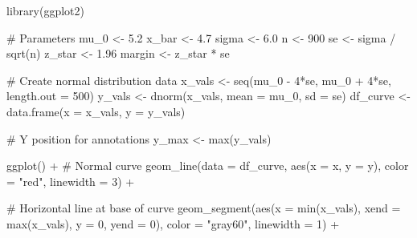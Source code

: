 \documentclass[
  letterpaper,
  DIV=11,
  numbers=noendperiod]{scrreprt}
\newenvironment{Shaded}{\begin{snugshade}}{\end{snugshade}}
\newcommand{\AttributeTok}[1]{\textcolor[rgb]{0.40,0.45,0.13}{#1}}
\newcommand{\CommentTok}[1]{\textcolor[rgb]{0.37,0.37,0.37}{#1}}
\newcommand{\DecValTok}[1]{\textcolor[rgb]{0.68,0.00,0.00}{#1}}
\newcommand{\FloatTok}[1]{\textcolor[rgb]{0.68,0.00,0.00}{#1}}
\newcommand{\FunctionTok}[1]{\textcolor[rgb]{0.28,0.35,0.67}{#1}}
\newcommand{\NormalTok}[1]{\textcolor[rgb]{0.00,0.23,0.31}{#1}}
\newcommand{\OtherTok}[1]{\textcolor[rgb]{0.00,0.23,0.31}{#1}}
\newcommand{\SpecialCharTok}[1]{\textcolor[rgb]{0.37,0.37,0.37}{#1}}
\newcommand{\StringTok}[1]{\textcolor[rgb]{0.13,0.47,0.30}{#1}}
\begin{document}
\begin{Shaded}
\begin{Highlighting}[]
\FunctionTok{library}\NormalTok{(ggplot2)}

\CommentTok{\# Parameters}
\NormalTok{mu\_0 }\OtherTok{\textless{}{-}} \FloatTok{5.2}
\NormalTok{x\_bar }\OtherTok{\textless{}{-}} \FloatTok{4.7}
\NormalTok{sigma }\OtherTok{\textless{}{-}} \FloatTok{6.0}
\NormalTok{n }\OtherTok{\textless{}{-}} \DecValTok{900}
\NormalTok{se }\OtherTok{\textless{}{-}}\NormalTok{ sigma }\SpecialCharTok{/} \FunctionTok{sqrt}\NormalTok{(n)}
\NormalTok{z\_star }\OtherTok{\textless{}{-}} \FloatTok{1.96}
\NormalTok{margin }\OtherTok{\textless{}{-}}\NormalTok{ z\_star }\SpecialCharTok{*}\NormalTok{ se}

\CommentTok{\# Create normal distribution data}
\NormalTok{x\_vals }\OtherTok{\textless{}{-}} \FunctionTok{seq}\NormalTok{(mu\_0 }\SpecialCharTok{{-}} \DecValTok{4}\SpecialCharTok{*}\NormalTok{se, mu\_0 }\SpecialCharTok{+} \DecValTok{4}\SpecialCharTok{*}\NormalTok{se, }\AttributeTok{length.out =} \DecValTok{500}\NormalTok{)}
\NormalTok{y\_vals }\OtherTok{\textless{}{-}} \FunctionTok{dnorm}\NormalTok{(x\_vals, }\AttributeTok{mean =}\NormalTok{ mu\_0, }\AttributeTok{sd =}\NormalTok{ se)}
\NormalTok{df\_curve }\OtherTok{\textless{}{-}} \FunctionTok{data.frame}\NormalTok{(}\AttributeTok{x =}\NormalTok{ x\_vals, }\AttributeTok{y =}\NormalTok{ y\_vals)}

\CommentTok{\# Y position for annotations}
\NormalTok{y\_max }\OtherTok{\textless{}{-}} \FunctionTok{max}\NormalTok{(y\_vals)}

\FunctionTok{ggplot}\NormalTok{() }\SpecialCharTok{+}
  \CommentTok{\# Normal curve}
  \FunctionTok{geom\_line}\NormalTok{(}\AttributeTok{data =}\NormalTok{ df\_curve, }\FunctionTok{aes}\NormalTok{(}\AttributeTok{x =}\NormalTok{ x, }\AttributeTok{y =}\NormalTok{ y), }
            \AttributeTok{color =} \StringTok{"red"}\NormalTok{, }\AttributeTok{linewidth =} \DecValTok{3}\NormalTok{) }\SpecialCharTok{+}
  
  \CommentTok{\# Horizontal line at base of curve}
  \FunctionTok{geom\_segment}\NormalTok{(}\FunctionTok{aes}\NormalTok{(}\AttributeTok{x =} \FunctionTok{min}\NormalTok{(x\_vals), }\AttributeTok{xend =} \FunctionTok{max}\NormalTok{(x\_vals), }
                   \AttributeTok{y =} \DecValTok{0}\NormalTok{, }\AttributeTok{yend =} \DecValTok{0}\NormalTok{),}
               \AttributeTok{color =} \StringTok{"gray60"}\NormalTok{, }\AttributeTok{linewidth =} \DecValTok{1}\NormalTok{) }\SpecialCharTok{+}
  

\end{Highlighting}
\end{Shaded}
\end{document}
